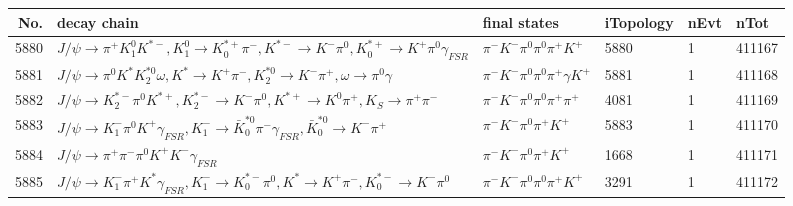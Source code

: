 \begin{table}[htbp] 
\begin{center}
\begin{small}
\begin{tabular}{rlllll}\hline\hline
 No. & decay chain & final states &  iTopology & nEvt & nTot \\\hline
5880&$J/\psi       \rightarrow \pi^{+}        K_1^{0}        K^{*-}         , K_1^{0}         \rightarrow K_{0}^{*+}     \pi^{-}        , K^{*-}          \rightarrow K^{-}          \pi^{0}        , K_{0}^{*+}      \rightarrow K^{+}          \pi^{0}        \gamma_{FSR} $&$\pi^{-}        K^{-}          \pi^{0}        \pi^{0}        \pi^{+}        K^{+}          $& 5880&    1&411167\\
5881&$J/\psi       \rightarrow \pi^{0}        K^{*}          K_2^{*0}       \omega         , K^{*}           \rightarrow K^{+}          \pi^{-}        , K_2^{*0}        \rightarrow K^{-}          \pi^{+}        , \omega          \rightarrow \pi^{0}        \gamma       $&$\pi^{-}        K^{-}          \pi^{0}        \pi^{0}        \pi^{+}        \gamma       K^{+}          $& 5881&    1&411168\\
5882&$J/\psi       \rightarrow K_2^{*-}       \pi^{0}        K^{*+}         , K_2^{*-}        \rightarrow K^{-}          \pi^{0}        , K^{*+}          \rightarrow K^{0}          \pi^{+}        , K_{S}           \rightarrow \pi^{+}        \pi^{-}        $&$\pi^{-}        K^{-}          \pi^{0}        \pi^{0}        \pi^{+}        \pi^{+}        $& 4081&    1&411169\\
5883&$J/\psi       \rightarrow K_{1}^{-}      \pi^{0}        K^{+}          \gamma_{FSR} , K_{1}^{-}       \rightarrow \bar{K}_0^{*0}\pi^{-}        \gamma_{FSR} , \bar{K}_0^{*0} \rightarrow K^{-}          \pi^{+}        $&$\pi^{-}        K^{-}          \pi^{0}        \pi^{+}        K^{+}          $& 5883&    1&411170\\
5884&$J/\psi       \rightarrow \pi^{+}        \pi^{-}        \pi^{0}        K^{+}          K^{-}          \gamma_{FSR} $&$\pi^{-}        K^{-}          \pi^{0}        \pi^{+}        K^{+}          $& 1668&    1&411171\\
5885&$J/\psi       \rightarrow K_{1}^{-}      \pi^{+}        K^{*}          \gamma_{FSR} , K_{1}^{-}       \rightarrow K_{0}^{*-}     \pi^{0}        , K^{*}           \rightarrow K^{+}          \pi^{-}        , K_{0}^{*-}      \rightarrow K^{-}          \pi^{0}        $&$\pi^{-}        K^{-}          \pi^{0}        \pi^{0}        \pi^{+}        K^{+}          $& 3291&    1&411172\\

\end{tabular}
\end{small}
\end{center}
\end{table}
